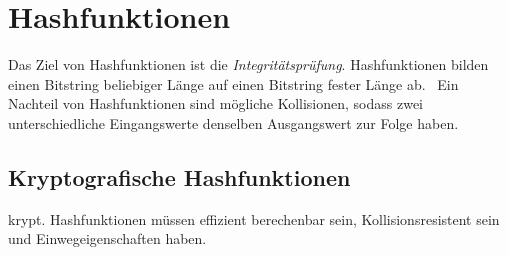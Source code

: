 \documentclass{report}
\begin{document}
\section{Hashfunktionen}
Das Ziel von Hashfunktionen ist die \textit{Integritätsprüfung}. Hashfunktionen bilden einen Bitstring beliebiger Länge auf einen Bitstring fester Länge ab. \
Ein Nachteil von Hashfunktionen sind mögliche Kollisionen, sodass zwei unterschiedliche Eingangswerte denselben Ausgangswert zur Folge haben.

\subsection{Kryptografische Hashfunktionen}
krypt. Hashfunktionen müssen effizient berechenbar sein, Kollisionsresistent sein und Einwegeigenschaften haben.

\subsection{}
\end{document}
